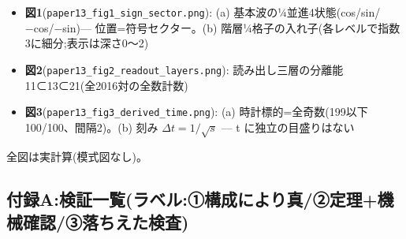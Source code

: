 \documentclass[
]{ltjsarticle}
\providecommand{\tightlist}{%
  \setlength{\itemsep}{0pt}\setlength{\parskip}{0pt}}
\begin{document}
\begin{itemize}
\tightlist
\item
  \textbf{図1}(\texttt{paper13\_fig1\_sign\_sector.png}): (a)
  基本波の¼並進4状態(cos/sin/−cos/−sin)--- 位置=符号セクター。(b)
  階層¼格子の入れ子(各レベルで指数3に細分;表示は深さ0〜2)
\item
  \textbf{図2}(\texttt{paper13\_fig2\_readout\_layers.png}):
  読み出し三層の分離能 11⊂13⊂21(全2016対の全数計数)
\item
  \textbf{図3}(\texttt{paper13\_fig3\_derived\_time.png}): (a)
  時計標的=全奇数(199以下 100/100、間隔2)。(b) 刻み
  \(\Delta t=1/\sqrt{s}\) --- t に独立の目盛りはない
\end{itemize}

全図は実計算(模式図なし)。

\subsection{付録A:検証一覧(ラベル:①構成により真/②定理+機械確認/③落ちえた検査)}\label{ux4ed8ux9332aux691cux8a3cux4e00ux89a7ux30e9ux30d9ux30ebux2460ux69cbux6210ux306bux3088ux308aux771fux2461ux5b9aux7406ux6a5fux68b0ux78baux8a8dux2462ux843dux3061ux3048ux305fux691cux67fb}
\end{document}
